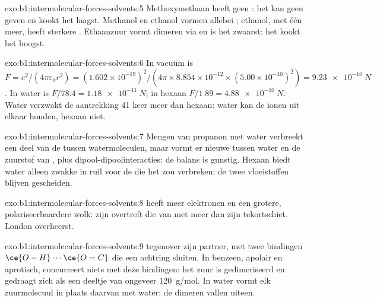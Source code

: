 \begin{solution}{exo:b1:intermolecular-forces-solvents:5}
Methoxymethaan heeft geen : het kan geen  geven
en kookt het laagst. Methanol en ethanol vormen allebei ;
ethanol, met één  meer, heeft sterkere .
Ethaanzuur vormt dimeren via  en is het zwaarst: het
kookt het hoogst.
\end{solution}

\begin{solution}{exo:b1:intermolecular-forces-solvents:6}
In vacuüm is $F = e^2/(4\pi\varepsilon_0 r^2) = (1.602 \times
10^{-19})^2/(4\pi \times 8.854 \times 10^{-12} \times (5.00 \times
10^{-10})^2) = \qty{9.23e-10}{N}$. In water is $F/78.4 = \qty{1.18e-11}{N}$;
in hexaan $F/1.89 = \qty{4.88e-10}{N}$. Water verzwakt de aantrekking
41 keer meer dan hexaan: water kan de ionen uit elkaar houden, hexaan
niet.
\end{solution}

\begin{solution}{exo:b1:intermolecular-forces-solvents:7}
Mengen van propanon met water verbreekt een deel van de 
tussen watermoleculen, maar vormt er nieuwe tussen water en de zuurstof
van , plus dipool-dipoolinteracties: de balans is gunstig.
Hexaan biedt water alleen zwakke  in ruil voor de
 die het zou verbreken: de twee vloeistoffen blijven
gescheiden.
\end{solution}

\begin{solution}{exo:b1:intermolecular-forces-solvents:8}
 heeft meer elektronen en een grotere, polariseerbaardere wolk:
zijn  overtreft die van  met meer dan zijn
 tekortschiet. London overheerst.
\end{solution}

\begin{solution}{exo:b1:intermolecular-forces-solvents:9}
 tegenover zijn partner, met twee
bindingen $\ce{O-H}\cdots\ce{O=C}$ die een achtring sluiten. In benzeen, apolair en aprotisch, concurreert niets
met deze bindingen: het zuur is gedimeriseerd en gedraagt zich als een
deeltje van ongeveer \qty{120}{g/mol}. In water vormt elk zuurmolecuul in
plaats daarvan  met water: de dimeren vallen uiteen.
\end{solution}

